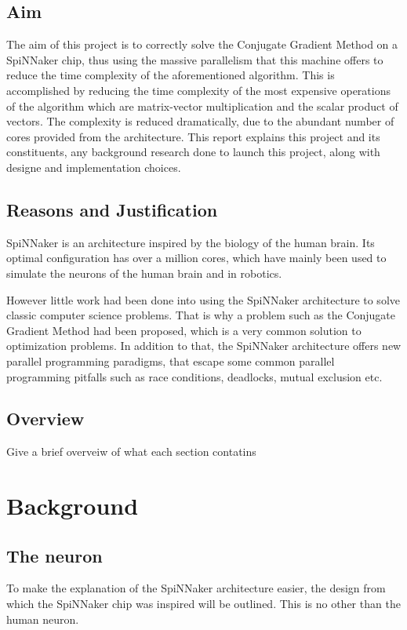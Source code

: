\documentclass[12pt,a4paper]{article}
\begin{document}
\subsection{Aim}
The aim of this project is to correctly solve the Conjugate Gradient Method\cite{hestenes1952methods} on a SpiNNaker chip, thus using the massive parallelism that this machine offers to reduce the time complexity of the aforementioned algorithm. This is accomplished by reducing the time complexity of the most expensive operations of the algorithm which are matrix-vector multiplication and the scalar product of vectors. The complexity is reduced dramatically, due to the abundant number of cores provided from the architecture. This report explains this project and its constituents, any background research done to launch this project, along with designe and implementation choices.
\subsection{Reasons and Justification}
\indent
SpiNNaker is an architecture inspired by the biology of the human brain. Its optimal configuration has over a million cores\cite{navaridas2009understanding}, which have mainly been used to simulate the neurons of the human brain and in robotics.

However little work had been done into using the SpiNNaker architecture to solve classic computer science problems. That is why a problem such as the Conjugate Gradient Method had been proposed, which is a very common solution to optimization problems. In addition to that, the SpiNNaker architecture offers new parallel programming paradigms, that escape some common parallel programming pitfalls such as race conditions, deadlocks, mutual exclusion etc\cite{sharp2011event}.
\subsection{Overview}
Give a brief overveiw of what each section contatins
\newpage
\section{Background}
\subsection{The neuron}
To make the explanation of the SpiNNaker architecture easier, the design from which the SpiNNaker chip was inspired will be outlined. This is no other than the human neuron.
\end{document}
